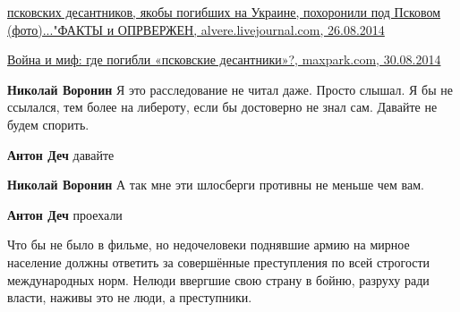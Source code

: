 \begin{itemize}
\begin{itemize}
\href{https://alvere.livejournal.com/47730.html}{%
псковских десантников, якобы погибших на Украине, похоронили под Псковом (фото)..."ФАКТЫ и ОПРВЕРЖЕН, %
alvere.livejournal.com, 26.08.2014%
}

\href{https://maxpark.com/community/13/content/2951039}{%
Война и миф: где погибли «псковские десантники»?, maxpark.com, 30.08.2014%
}

 
\textbf{Николай Воронин} Я это расследование не читал даже. Просто слышал. Я бы не ссылался, тем более на либероту, если бы достоверно не знал сам. Давайте не будем спорить.

 
\textbf{Антон Деч} давайте

 
\textbf{Николай Воронин} А так мне эти шлосберги противны не меньше чем вам.

 
\textbf{Антон Деч} проехали

\end{itemize}


Что бы не было в фильме, но недочеловеки поднявшие армию на мирное население
должны ответить за совершённые преступления по всей строгости международных
норм. Нелюди ввергшие свою страну в бойню, разруху ради власти, наживы это не
люди, а преступники.


\end{itemize}
